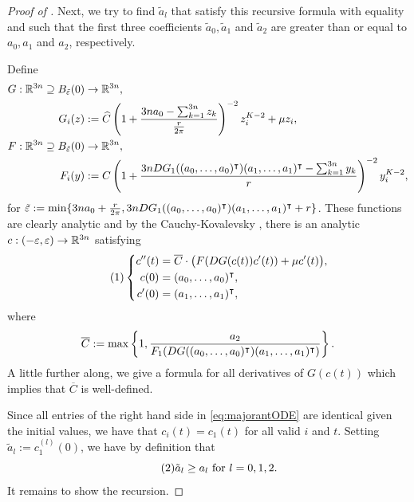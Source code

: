 \begin{proof}[Proof of ]
    Next, we try to find $\tilde a_l$ that satisfy this recursive formula with equality and such that the first three coefficients $\tilde a_0, \tilde a_1$ and $\tilde a_2$ are greater than or equal to $a_0,a_1$ and $a_2$, respectively.
    
    Define
    \begin{alignat*}{2}
        G: \mathbb{R}^{3n} \supseteq B_{\tilde {\varepsilon}}(0) &\to \mathbb{R}^{3n},\\
        G_i(z) &:= \widehat C \left( 1 + \frac {3n a_0 - \sum_{k=1}^{3n} z_k} {\frac {r} {2\pi}} \right)^{-2} z_i^{K-2} + \mu z_i,\\
        F: \mathbb{R}^{3n} \supseteq B_{\tilde {\varepsilon}}(0) &\to \mathbb{R}^{3n},\\
        F_i(y) &:= C \left( 1 + \frac {3n DG_1((a_0,\ldots,a_0)^\intercal)(a_1, \ldots,a_1)^\intercal  - \sum_{k=1}^{3n} y_k} {r} \right)^{-2} y_i^{K-2},\\
    \end{alignat*}
    for $\tilde {\varepsilon} := \min\{3n a_0 + \frac {r} {2\pi}, 3n DG_1((a_0,\ldots,a_0)^\intercal)(a_1, \ldots,a_1)^\intercal + r\}$.
    These functions are clearly analytic and by the Cauchy-Kovalevsky , there is an analytic $c: (-\varepsilon,\varepsilon) \to \mathbb{R}^{3n}$ satisfying 
    \[
    \numberthis
    \label{eq:majorantODE}
    \left\{
        \begin{split}
            c''(t) &= \overline{C} \cdot \bigl(F(DG(c(t)) c'(t)) + \mu c'(t)\bigr),\\
            c(0) &= (a_0,\ldots,a_0)^\transpose,\\
            c'(0) &= (a_1,\ldots,a_1)^\transpose,
        \end{split}
    \right.
    \]
    where 
    \[
        \overline{C} := \max\left\{1, \frac{a_2} {F_1(DG((a_0,\ldots,a_0)^\intercal)(a_1,\ldots,a_1)^\intercal)} \right\}.
    \]
    A little further along, we give a formula for all derivatives of $G(c(t))$ which implies that $\overline C$ is well-defined.
    
    Since all entries of the right hand side in \eqref{eq:majorantODE} are identical given the initial values, we have that $c_i(t) = c_1(t)$ for all valid $i$ and $t$.
    Setting $\tilde a_l := c_1^{(l)}(0)$, we have by definition that 
    \[
        \label{eq:tildeAFirstThreeTerms}
        \numberthis
        \tilde a_l \ge a_l \text{ for } l=0,1,2.
    \]
    It remains to show the recursion.
    

\end{proof}

